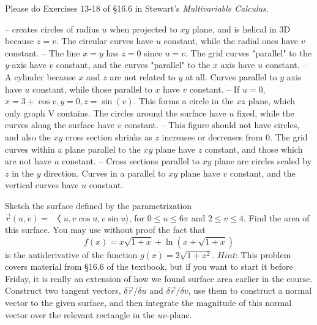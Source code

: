 \documentclass[12pt]{exam}
\begin{document}
\begin{questions}
\question Please do Exercises 13-18 of §16.6 in Stewart’s \textit{Multivariable Calculus}.
    \begin{solution}
        \begin{questions}
            \setcounter{question}{12}
            \question {} -- creates circles of radius $u$ when projected to $xy$ plane, and is helical in 3D because $z = v$. The circular curves have $u$ constant, while the radial ones have $v$ constant.
            \question {} -- The line $x=y$ has $z=0$ since $u=v$. The grid curves "parallel" to the $y$-axis have $v$ constant, and the curves "parallel" to the $x$ axis have $u$ constant.
            \question {} -- A cylinder because $x$ and $z$ are not related to $y$ at all. Curves parallel to $y$ axis have $u$ constant, while those parallel to $x$ have $v$ constant.
            \question {} -- If $u=0$, $x = 3 + \cos v, y = 0, z = \sin(v)$. This forms a circle in the $xz$ plane, which only graph V contains. The circles around the surface have $u$ fixed, while the curves along the surface have $v$ constant.
            \question {} -- This figure should not have circles, and also the $xy$ cross section shrinks as $z$ increases or decreases from 0. The grid curves within a plane parallel to the $xy$ plane have $z$ constant, and those which are not have $u$ constant.
            \question  {} -- Cross sections parallel to $xy$ plane are circles scaled by $z$ in the $y$ direction. Curves in a parallel to $xy$ plane have $v$ constant, and the vertical curves have $u$ constant.
        \end{questions}
    \end{solution}

\question Sketch the surface defined by the parametrization $\overrightarrow{r} (u, v) = 〈u, v \cos u, v \sin u \rangle$, for $0 \leq u \leq 6\pi$ and $2 \leq v \leq 4$. Find the area of this surface. You may use without proof the fact that
\[f (x) = x\sqrt{1 + x} + \ln(x + \sqrt{1 + x})\]
is the antiderivative of the function $g(x) = 2\sqrt{1 + x^2}$. $Hint$: This problem covers material from §16.6 of the textbook, but if you want to start it before Friday, it is really an extension of how we found surface area earlier in the course. Construct two tangent vectors, $\delta \overrightarrow{r} / \delta u$ and $\delta \overrightarrow{r} / \delta v$, use them to construct a normal vector to the given surface, and then integrate the magnitude of this normal vector over the relevant rectangle in the $uv$-plane.

\end{questions}
\end{document}
